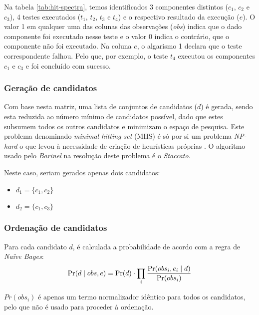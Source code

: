 Na tabela \ref{tab:hit-spectra}, temos identificados 3 componentes distintos ($c_1$, $c_2$ e $c_3$), 4 testes executados ($t_1$, $t_2$, $t_3$ e $t_4$) e o respectivo resultado da execução ($e$). O valor 1 em qualquer uma das colunas das observações (\emph{obs}) indica que o dado componente foi executado nesse teste e o valor 0 indica o contrário, que o componente não foi executado. Na coluna $e$, o algarismo 1 declara que o teste correspondente falhou. 
Pelo que, por exemplo, o teste $t_4$ executou os componentes $c_1$ e $c_3$ e foi concluído com sucesso.


% 
%

\subsubsection{Geração de candidatos} 

Com base nesta matriz, uma lista de conjuntos de candidatos ($d$) é gerada, sendo esta reduzida ao número mínimo de candidatos possível, dado que estes subsumem todos os outros candidatos e minimizam o espaço de pesquisa. Este problema denominado \emph{minimal hitting set} (MHS) é só por si um problema \emph{NP-hard} o que levou à necessidade de criação de heurísticas próprias \cite{RuiAbreu, Cardoso2013}. O algoritmo usado pelo \emph{Barinel} na resolução deste problema é o \emph{Staccato}.

Neste caso, seriam gerados apenas dois candidatos:

\begin{itemize}
\item $d_1 = \{c_1, c_2\}$ 
\item $d_2 = \{c_1, c_3\}$ 
\end{itemize}

% 
%

\subsubsection{Ordenação de candidatos} 

Para cada candidato $d$, é calculada a probabilidade de acordo com a regra de \emph{Naïve Bayes}:
%
\begin{equation}
	\mbox{Pr}(d\mid obs,e) =  \mbox{Pr}(d) \cdot \prod_{i}\frac{\mbox{Pr}(obs_i, e_i \mid d)}{\mbox{Pr}(obs_i)}
\end{equation}


$Pr(obs_i)$ é apenas um termo normalizador idêntico para todos os candidatos, pelo que não é usado para proceder à ordenação.

